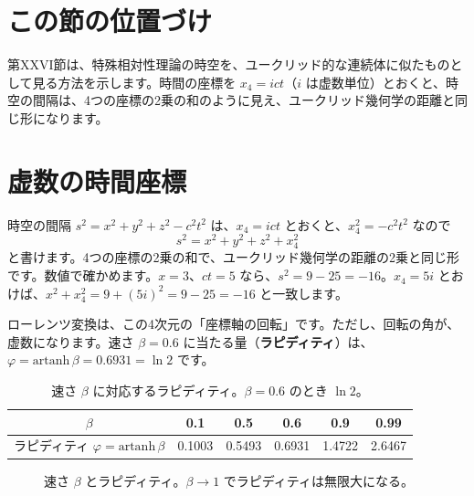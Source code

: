 \documentclass[a4paper,11pt,openany]{ltjsbook}
\begin{document}
\section{この節の位置づけ}

第XXVI節は、特殊相対性理論の時空を、ユークリッド的な連続体に似たものとして見る方法を示します。時間の座標を $x_4=ict$（$i$ は虚数単位）とおくと、時空の間隔は、4つの座標の2乗の和のように見え、ユークリッド幾何学の距離と同じ形になります。

\section{虚数の時間座標}

時空の間隔 $s^2=x^2+y^2+z^2-c^2t^2$ は、$x_4=ict$ とおくと、$x_4^2=-c^2t^2$ なので
\[
s^2=x^2+y^2+z^2+x_4^2
\]
と書けます。4つの座標の2乗の和で、ユークリッド幾何学の距離の2乗と同じ形です。数値で確かめます。$x=3$、$ct=5$ なら、$s^2=9-25=-16$。$x_4=5i$ とおけば、$x^2+x_4^2=9+(5i)^2=9-25=-16$ と一致します。

ローレンツ変換は、この4次元の「座標軸の回転」です。ただし、回転の角が、虚数になります。速さ $\beta=0.6$ に当たる量（\textbf{ラピディティ}）は、$\varphi=\mathrm{artanh}\,\beta=0.6931=\ln2$ です。

\begin{table}[htbp]
\centering
\begin{tabular}{c|ccccc}
\toprule
$\beta$ & 0.1 & 0.5 & 0.6 & 0.9 & 0.99\\
\midrule
ラピディティ $\varphi=\mathrm{artanh}\,\beta$ & 0.1003 & 0.5493 & 0.6931 & 1.4722 & 2.6467\\
\bottomrule
\end{tabular}
\caption{速さ $\beta$ に対応するラピディティ。$\beta=0.6$ のとき $\ln 2$。}
\end{table}

\begin{figure}[htbp]
\centering
{}
\caption{速さ $\beta$ とラピディティ。$\beta\to1$ でラピディティは無限大になる。}
\end{figure}
\end{document}
